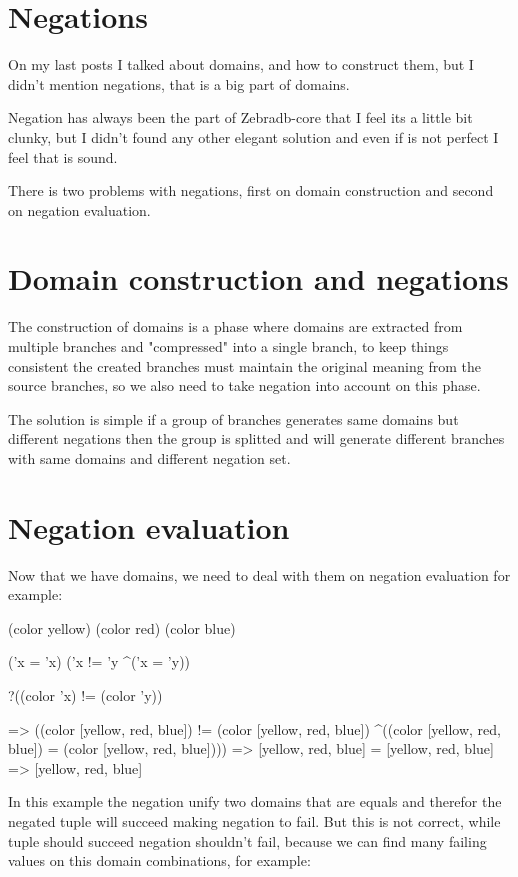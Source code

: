 \documentclass{article}
\begin{document}
\section{Negations}


On my last posts I talked about domains, and how to construct them, but I didn't mention negations, that is a big part of domains.

Negation has always been the part of Zebradb-core that I feel its a little bit clunky, but I didn't found any other elegant solution
and even if is not perfect I feel that is sound.

There is two problems with negations, first on domain construction and second on negation evaluation.

\section{Domain construction and negations}

The construction of domains is a phase where domains are extracted from multiple branches and "compressed" into a single branch, 
to keep things consistent the created branches must maintain the original meaning from the source branches, so 
we also need to take negation into account on this phase.

The solution is simple if a group of branches generates same domains but different negations then the group is splitted and will 
generate different branches with same domains and different negation set.

\section{Negation evaluation}

Now that we have domains, we need to deal with them on negation evaluation for example:

(color yellow)
(color red)
(color blue)

('x = 'x)
('x != 'y ^('x = 'y))

?((color 'x) != (color 'y))

=> ((color [yellow, red, blue]) != (color [yellow, red, blue]) ^((color [yellow, red, blue]) = (color [yellow, red, blue])))
=> [yellow, red, blue] = [yellow, red, blue] => [yellow, red, blue]

In this example the negation unify two domains that are equals and therefor the negated tuple will succeed making negation to fail.
But this is not correct, while tuple should succeed negation shouldn't fail, because we can find many failing values on this domain combinations,
for example: 
\end{document}
